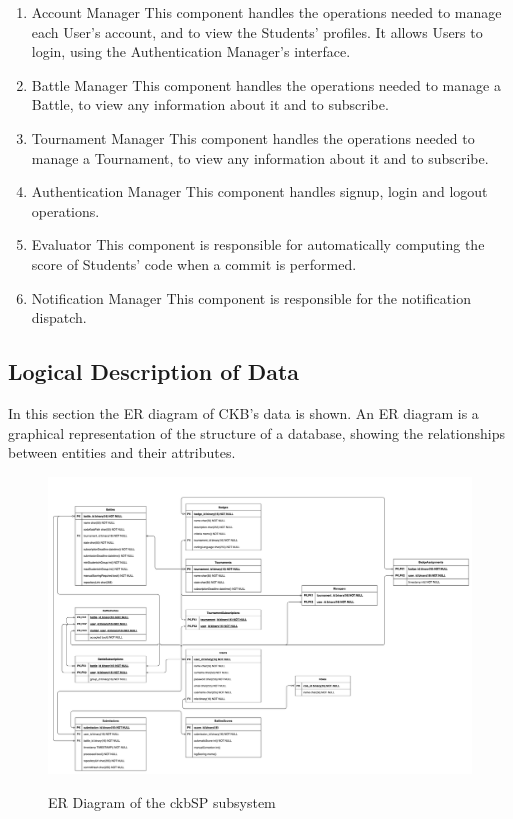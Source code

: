 \documentclass{Configuration_Files/Template}
\begin{document}
\begin{enumerate}
  \item \textcolor{bluepoli}{Account Manager} This component handles the operations needed to manage each User's account, and to view the Students' profiles. It allows Users to login, using the Authentication Manager's interface.
    \item \textcolor{bluepoli}{Battle Manager} This component handles the operations needed to manage a Battle, to view any information about it and to subscribe.
    \item \textcolor{bluepoli}{Tournament Manager} This component handles the operations needed to manage a Tournament, to view any information about it and to subscribe.
    \item \textcolor{bluepoli}{Authentication Manager} This component handles signup, login and logout operations.
    \item \textcolor{bluepoli}{Evaluator} This component is responsible for automatically computing the score of Students' code when a commit is performed. 
    \item \textcolor{bluepoli}{Notification Manager} This component is responsible for the notification dispatch.
\end{enumerate}

\subsection{Logical Description of Data}

In this section the ER diagram of CKB's data is shown. An ER diagram is a graphical representation of the structure of a database, showing the relationships between entities and their attributes.

\begin{figure}[H]
\centering
\includegraphics[scale = 0.3]{Images/diagrams/ER_Diagram.png}\\
\caption{ER Diagram of the ckbSP subsystem}
\end{figure}
\end{document}

